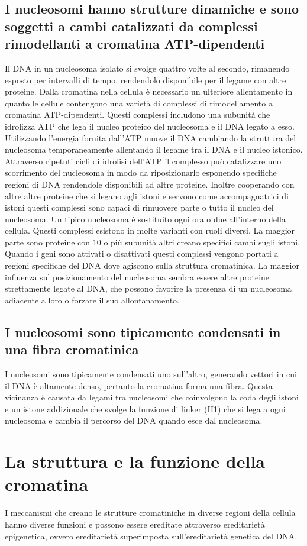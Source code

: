 \subsection{I nucleosomi hanno strutture dinamiche e sono soggetti a cambi catalizzati da complessi rimodellanti a cromatina ATP-dipendenti}
Il DNA in un nucleosoma isolato si svolge quattro volte al secondo, rimanendo esposto per intervalli di tempo, rendendolo disponibile per il legame con altre proteine. Dalla
cromatina nella cellula \`e necessario un ulteriore allentamento in quanto le cellule contengono una variet\`a di complessi di rimodellamento a cromatina ATP-dipendenti.
Questi complessi includono una subunit\`a che idrolizza ATP che lega il nucleo proteico del nucleosoma e il DNA legato a esso. Utilizzando l'energia fornita dall'ATP muove il DNA
cambiando la struttura del nucleosoma temporaneamente allentando il legame tra il DNA e il nucleo istonico. Attraverso ripetuti cicli di idrolisi dell'ATP il complesso pu\`o catalizzare
uno scorrimento del nucleosoma in modo da riposizionarlo esponendo specifiche regioni di DNA rendendole disponibili ad altre proteine. Inoltre cooperando con altre altre proteine che si
legano agli istoni e servono come accompagnatrici di istoni questi complessi sono capaci di rimuovere parte o tutto il nucleo del nucleosoma. Un tipico nucleosoma \`e sostituito ogni
ora o due all'interno della cellula. Questi complessi esistono in molte varianti con ruoli diversi. La maggior parte sono proteine con $10$ o pi\`u subunit\`a altri creano specifici
cambi sugli istoni. Quando i geni sono attivati o disattivati questi complessi vengono portati a regioni specifiche del DNA dove agiscono sulla struttura cromatinica. La maggior 
influenza sul posizionamento del nucleosoma sembra essere altre proteine strettamente legate al DNA, che possono favorire la presenza di un nucleosoma adiacente a loro o forzare il 
suo allontanamento. 
\subsection{I nucleosomi sono tipicamente condensati in una fibra cromatinica}
I nucleosomi sono tipicamente condensati uno sull'altro, generando vettori in cui il DNA \`e altamente denso, pertanto la cromatina forma una fibra. Questa vicinanza \`e causata da 
legami tra nucleosomi che coinvolgono la coda degli istoni e un istone addizionale che svolge la funzione di linker (H1) che si lega a ogni nucleosoma e cambia il percorso del DNA 
quando esce dal nucleosoma. 
\section{La struttura e la funzione della cromatina}
I meccanismi che creano le strutture cromatiniche in diverse regioni della cellula hanno diverse funzioni e possono essere ereditate attraverso ereditariet\`a epigenetica, ovvero 
ereditariet\`a superimposta sull'ereditariet\`a genetica del DNA. 
